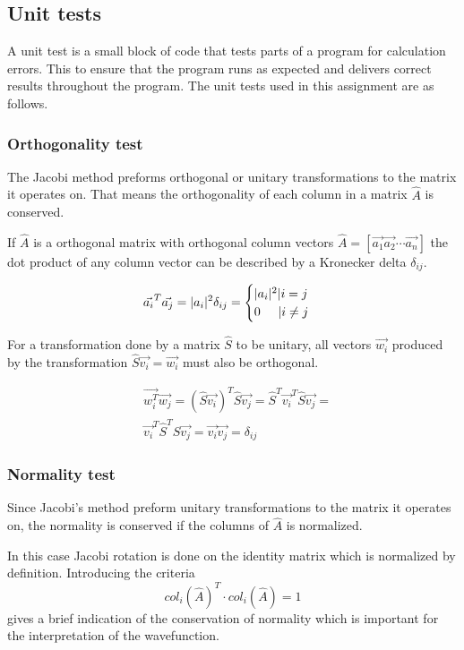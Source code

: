 \documentclass[twoside,twocolumn]{article}
\newcommand{\nl}{
	
	\medskip
	\noindent
}
\begin{document}
	\subsection{Unit tests}
	A unit test is a small block of code that tests parts of a program for calculation errors. This to ensure that the program runs as expected and delivers correct results throughout the program. The unit tests used in this assignment are as follows.
	
	\subsubsection{Orthogonality test}
	
	The Jacobi method preforms orthogonal or unitary transformations to the matrix it operates on. That means the orthogonality of each column in a matrix $\hat{A}$ is conserved.\nl
	
	If $\hat{A}$ is a orthogonal matrix with orthogonal column vectors $\hat{A} = [\vec{a_1} \vec{a_2} \cdots \vec{a_n}  ]$ the dot product of any column vector can be described by a Kronecker delta $\delta_{ij}$.
	
	\begin{align*}
	\vec{a_i}^T \vec{a_j} = |a_i|^2\delta_{ij} =
	\begin{cases}
	|a_i|^2|i=j\\
	0\hspace{0.5cm}|i\neq j
	\end{cases}
	\end{align*}
	
	For a transformation done by a matrix $\hat{S}$ to be unitary, all vectors $\vec{w_i}$ produced by the transformation $\hat{S}\vec{v_i} = \vec{w_i}$ must also be orthogonal.
	
	\begin{align*}
	&\vec{w_i^T}\vec{w_j} = (\hat{S}\vec{v_i})^T\hat{S}\vec{v_j} = \hat{S}^T\vec{v_i}^T\hat{S}\vec{v_j} = \\ &\vec{v_i}^T\hat{S}^T\hat{S}\vec{v_j} = \vec{v_i}\vec{v_j} = \delta_{ij}
	\end{align*}
	
	\subsubsection{Normality test}	
	Since Jacobi's method preform unitary transformations to the matrix it operates on, the normality is conserved if the columns of $\hat{A}$ is normalized.\nl
	In this case Jacobi rotation is done on the identity matrix which is normalized by definition. Introducing the criteria $$col_i(\hat{A})^T\cdot col_i(\hat{A})=1$$ gives a brief indication of the conservation of normality which is important for the interpretation of the wavefunction.
\end{document}

